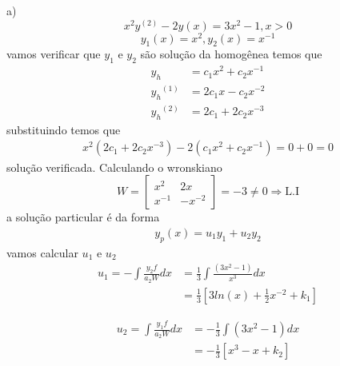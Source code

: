 \documentclass[a4paper,12pt]{article}
\begin{document}
a)
$$ x^{2}y^{(2)} -2y(x) = 3x^{2} - 1, x > 0$$ 
$$y_1(x) = x^{2}, y_2(x) = x^{-1}$$
vamos verificar que $y_1$ e $y_2$ s\~ao solu\c c\~ao da homog\^enea temos que 
\begin{align*}
	y_h &= c_1 x^{2}  + c_2 x^{-1} \\
	{y_h}^{(1)} &= 2 c_1x -c_2 x^{-2} \\
	{y_h}^{(2)} &= 2 c_1 +2c_2 x^{-3}
\end{align*}
substituindo temos que 
\begin{align*}
	x^{2} (2 c_1 +2c_2 x^{-3}) - 2(c_1 x^{2}  + c_2 x^{-1}) = 0 + 0 = 0
\end{align*}
solu\c c\~ao verificada. Calculando o wronskiano
\[ W = \left [ 
	\begin{array}{cc}
		x^{2} & 2x \\
		x^{-1} & -x^{-2}
	\end{array}
\right ] = -3 \neq 0 \Rightarrow \mbox{L.I}
\]
a solu\c c\~ao particular \'e da forma 
\begin{align*}
	y_p(x) = u_1 y_1 + u_2 y_2 
\end{align*}
vamos calcular $u_1$ e $u_2$
\begin{align*}
	u_1 = - \int \frac{y_2 f}{a_2 W} dx &= \frac{1}{3} \int \frac{(3x^{2} -1)}{x^{3}} dx \\ 
	& = \frac{1}{3}\left [ 3ln(x) + \frac{1}{2}x^{-2} + k_1\right ] 
\end{align*}

\begin{align*}
	u_2 =  \int \frac{y_1 f}{a_2 W} dx &= -\frac{1}{3} \int (3x^{2} -1) dx\\
	&= -\frac{1}{3}\left [ x^{3} - x + k_2\right ] 
\end{align*}
\end{document}
